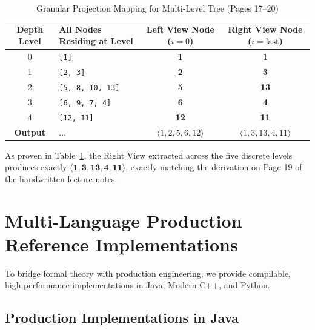 \documentclass[10pt,journal,compsoc,onecolumn]{IEEEtran}
\begin{document}
\begin{table}[htbp]
\centering
\caption{Granular Projection Mapping for Multi-Level Tree (Pages 17--20)}
\label{tab:view_projections_detailed}
\begin{tabular}{clcc}
\toprule
\textbf{Depth Level} & \textbf{All Nodes Residing at Level} & \textbf{Left View Node ($i = 0$)} & \textbf{Right View Node ($i = \text{last}$)} \\
\midrule
0 & \texttt{[1]} & \textbf{1} & \textbf{1} \\
1 & \texttt{[2, 3]} & \textbf{2} & \textbf{3} \\
2 & \texttt{[5, 8, 10, 13]} & \textbf{5} & \textbf{13} \\
3 & \texttt{[6, 9, 7, 4]} & \textbf{6} & \textbf{4} \\
4 & \texttt{[12, 11]} & \textbf{12} & \textbf{11} \\
\midrule
\textbf{Output} & $\dots$ & $\langle 1, 2, 5, 6, 12 \rangle$ & $\langle 1, 3, 13, 4, 11 \rangle$ \\
\bottomrule
\end{tabular}
\end{table}

As proven in Table~\ref{tab:view_projections_detailed}, the Right View extracted across the five discrete levels produces exactly $\mathbf{\langle 1, 3, 13, 4, 11 \rangle}$, exactly matching the derivation on Page 19 of the handwritten lecture notes.

\section{Multi-Language Production Reference Implementations}
\label{sec:implementations}

To bridge formal theory with production engineering, we provide compilable, high-performance implementations in Java, Modern C++, and Python.

\subsection{Production Implementations in Java}
\end{document}

